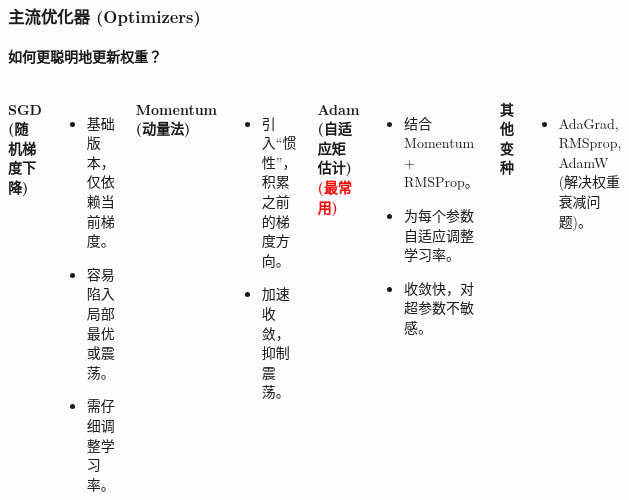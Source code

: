 \documentclass[12pt, t, aspectratio=169]{beamer}
\begin{document}
\begin{frame}
    \frametitle{主流优化器 (Optimizers)}
    \framesubtitle{如何更聪明地更新权重？}
    
    \begin{columns}[T]
        \textbf{SGD (随机梯度下降)}
        \begin{itemize}
            \item 基础版本，仅依赖当前梯度。
            \item 容易陷入局部最优或震荡。
            \item 需仔细调整学习率。
        \end{itemize}
        
        \vspace{0.3cm}
        \textbf{Momentum (动量法)}
        \begin{itemize}
            \item 引入“惯性”，积累之前的梯度方向。
            \item 加速收敛，抑制震荡。
        \end{itemize}
        
        \textbf{Adam (自适应矩估计)} \textcolor{red}{\textbf{(最常用)}}
        \begin{itemize}
            \item 结合 Momentum + RMSProp。
            \item 为每个参数自适应调整学习率。
            \item 收敛快，对超参数不敏感。
        \end{itemize}
        
        \vspace{0.3cm}
        \textbf{其他变种}
        \begin{itemize}
            \item AdaGrad, RMSprop, AdamW (解决权重衰减问题)。
        \end{itemize}
    \end{columns}
    
\end{frame}
\end{document}
